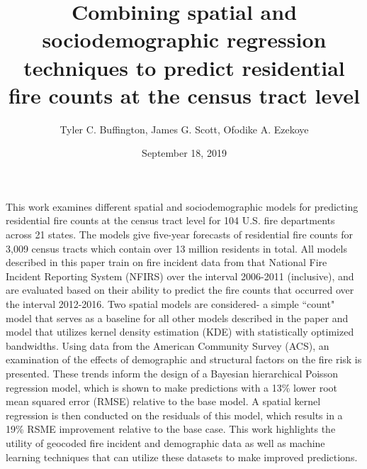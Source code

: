 \documentclass{svjour3}
\begin{document}
\title{Combining spatial and sociodemographic regression techniques to predict residential fire counts at the census tract level}
\author{Tyler C. Buffington, James G. Scott, Ofodike A. Ezekoye}
\date{September 18, 2019}

\maketitle

\abstract
This work examines different spatial and sociodemographic models for predicting residential fire counts at the census tract level for 104 U.S. fire departments across 21 states. The models give five-year forecasts of residential fire counts for 3,009 census tracts which contain over 13 million residents in total. All models described in this paper train on fire incident data from that National Fire Incident Reporting System (NFIRS) over the interval 2006-2011 (inclusive), and are evaluated based on their ability to predict the fire counts that occurred over the interval 2012-2016. Two spatial models are considered- a simple ``count" model that serves as a baseline for all other models described in the paper and model that utilizes kernel density estimation (KDE) with statistically optimized bandwidths. Using data from the American Community Survey (ACS), an examination of the effects of demographic and structural factors on the fire risk is presented. These trends inform the design of a Bayesian hierarchical Poisson regression model, which is shown to make predictions with a 13\% lower root mean squared error (RMSE) relative to the base model. A spatial kernel regression is then conducted on the residuals of this model, which results in a 19\% RSME improvement relative to the base case. This work highlights the utility of geocoded fire incident and demographic data as well as machine learning techniques that can utilize these datasets to make improved predictions. 
\end{document}
